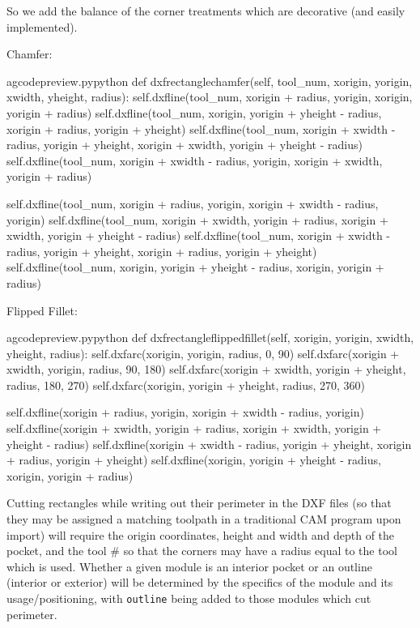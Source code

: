 \documentclass{ltxdoc}
\begin{document}
\noindent So we add the balance of the corner treatments which are decorative (and easily implemented). 

Chamfer:

\lstset{firstnumber=\thegcpy}
\begin{writecode}{a}{gcodepreview.py}{python}
    def dxfrectanglechamfer(self, tool_num, xorigin, yorigin, xwidth, yheight, radius):
        self.dxfline(tool_num, xorigin + radius, yorigin, xorigin, yorigin + radius)
        self.dxfline(tool_num, xorigin, yorigin + yheight - radius, xorigin + radius, yorigin + yheight)
        self.dxfline(tool_num, xorigin + xwidth - radius, yorigin + yheight, xorigin + xwidth, yorigin + yheight - radius)
        self.dxfline(tool_num, xorigin + xwidth - radius, yorigin, xorigin + xwidth, yorigin + radius)

        self.dxfline(tool_num, xorigin + radius, yorigin, xorigin + xwidth - radius, yorigin)
        self.dxfline(tool_num, xorigin + xwidth, yorigin + radius, xorigin + xwidth, yorigin + yheight - radius)
        self.dxfline(tool_num, xorigin + xwidth - radius, yorigin + yheight, xorigin + radius, yorigin + yheight)
        self.dxfline(tool_num, xorigin, yorigin + yheight - radius, xorigin, yorigin + radius)

\end{writecode}
\addtocounter{gcpy}{11}

Flipped Fillet:

\lstset{firstnumber=\thegcpy}
\begin{writecode}{a}{gcodepreview.py}{python}
    def dxfrectangleflippedfillet(self, xorigin, yorigin, xwidth, yheight, radius):
        self.dxfarc(xorigin, yorigin, radius,  0, 90)
        self.dxfarc(xorigin + xwidth, yorigin, radius, 90, 180)
        self.dxfarc(xorigin + xwidth, yorigin + yheight, radius, 180, 270)
        self.dxfarc(xorigin, yorigin + yheight, radius, 270, 360)

        self.dxfline(xorigin + radius, yorigin, xorigin + xwidth - radius, yorigin)
        self.dxfline(xorigin + xwidth, yorigin + radius, xorigin + xwidth, yorigin + yheight - radius)
        self.dxfline(xorigin + xwidth - radius, yorigin + yheight, xorigin + radius, yorigin + yheight)
        self.dxfline(xorigin, yorigin + yheight - radius, xorigin, yorigin + radius)

\end{writecode}
\addtocounter{gcpy}{11}

Cutting rectangles while writing out their perimeter in the DXF files (so that they may be assigned a matching toolpath in a traditional CAM program upon import) will require the origin coordinates, height and width and depth of the pocket, and the tool \# so that the corners may have a radius equal to the tool which is used. Whether a given module is an interior pocket or an outline (interior or exterior) will be determined by the specifics of the module and its usage/positioning, with \texttt{outline} being added to those modules which cut perimeter.
\end{document}
